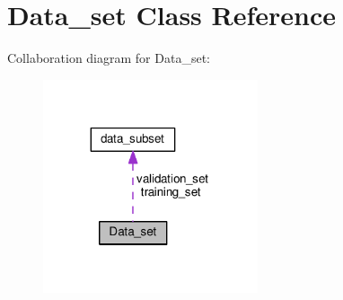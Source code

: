 \hypertarget{classData__set}{\section{Data\-\_\-set Class Reference}
\label{classData__set}
}


Collaboration diagram for Data\-\_\-set\-:
\nopagebreak
\begin{figure}[H]
\begin{center}
\leavevmode
\includegraphics[width=179pt]{classData__set__coll__graph}
\end{center}
\end{figure}
